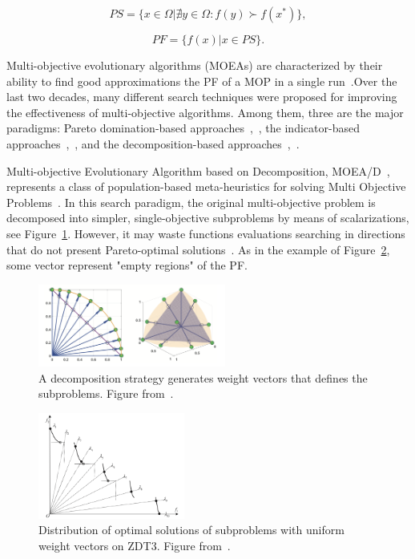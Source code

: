 \begin{equation}
PS = \{x \in \Omega | \nexists y \in \Omega : f(y) \succ f(x^*)  \},
\end{equation}

\begin{equation}
PF = \{f(x) | x \in PS \}.
\end{equation}

Multi-objective evolutionary algorithms (MOEAs) are characterized by their ability to find good approximations the PF of a MOP in a single run~\cite{zhou2011multiobjective}.Over the last two decades, many different search techniques were proposed for improving the effectiveness of multi-objective algorithms. Among them, three are the major paradigms: Pareto domination-based approaches~\cite{deb2002fast},~\cite{zitzler2001spea2}, the indicator-based approaches~\cite{beume2007sms},~\cite{zitzler2004indicator}, and the decomposition-based approaches~\cite{li2009multiobjective},~\cite{zhang2007moea}. 


Multi-objective Evolutionary Algorithm based on Decomposition, MOEA/D~\cite{zhang2007moea}, represents a class of population-based meta-heuristics for solving Multi Objective Problems~\cite{trivedi2017survey}. In this search paradigm, the original multi-objective problem is decomposed into simpler, single-objective subproblems by means of scalarizations, see Figure~\ref{fig1}.
However, it may waste functions evaluations searching in directions that do not present Pareto-optimal solutions~\cite{bezerra2015comparing}. As in the example of Figure~\ref{fig2}, some vector represent "empty regions" of the PF.
\begin{figure}[h]
	\centering
	\includegraphics[width=0.55\textwidth]{img/decomp2.png}
	\caption{A decomposition strategy generates weight vectors that defines the subproblems. Figure from~\cite{chugh2017handling}.}
	\label{fig1}
\end{figure}

\begin{figure}[h]
	\centering
	\includegraphics[width=0.43\textwidth]{img/harder_problems}
	\caption{Distribution of optimal solutions of subproblems with uniform weight vectors on ZDT3. Figure from~\cite{li2015use}.}
	\label{fig2}
\end{figure}


